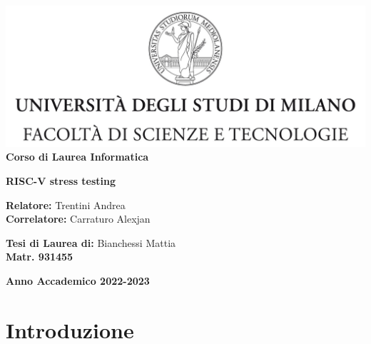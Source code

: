 \documentclass[12pt,a4paper]{report}
\begin{document}
\begin{titlepage}
\begin{center}
\includegraphics[width=\textwidth]{Img/Logo.jpg}\\
{\large{\bf Corso di Laurea Informatica}}
\end{center}
\vspace{12mm}
\begin{center}

\vspace{4mm}
{\huge{\bf RISC-V stress testing}}\\
\vspace{4mm}

\end{center}
\vspace{12mm}
\begin{flushleft}
{\large{\bf Relatore:}}
{\large{Trentini Andrea}}\\
\vspace{4mm}
{\large{\bf Correlatore:}}
{\large{Carraturo Alexjan}}\\
\end{flushleft}
\vspace{12mm}
\begin{flushright}
{\large{\bf Tesi di Laurea di:}}
{\large{Bianchessi Mattia}}\\
{\large{\bf Matr. 931455}}\\
\end{flushright}
\vspace{4mm}
\begin{center}
{\large{\bf Anno Accademico 2022-2023}}
\end{center}
\end{titlepage}


\listoftodos

\chapter*{Introduzione}
\end{document}
